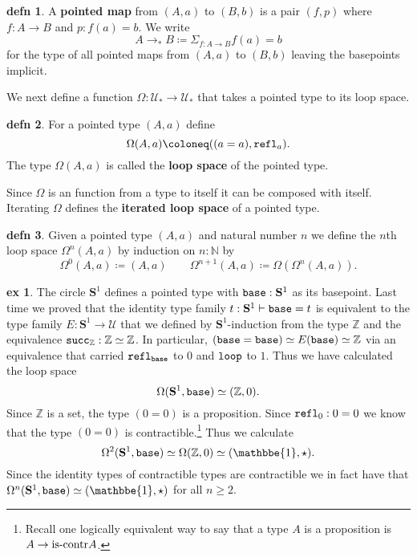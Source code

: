 \documentclass{amsart}
\theoremstyle{theorem}
\theoremstyle{definition}
\newtheorem*{defn}{defn}
\newtheorem*{ex}{ex}
\theoremstyle{remark}
\newcommand{\0}{\mathbbe{0}}
\newcommand{\1}{\mathbbe{1}}
\newcommand{\2}{\mathbbe{2}}
\newcommand{\3}{\mathbbe{3}}
\newcommand{\4}{\mathbbe{4}}
\newcommand{\NN}{\mathbb{N}}
\newcommand{\ZZ}{\mathbb{Z}}
\newcommand{\term}[1]{{\textup{\texttt{#1}}}}
\newcommand{\type}[1]{{\textup{#1}}}
\newcommand{\refl}{\term{refl}}
\newcommand{\UU}{{\mathcal{U}}}
\newcommand{\iscontr}{\type{is-contr}}
\newcommand{\Sone}{\mathbf{S}^1}
\newcommand{\base}{\term{base}}
\newcommand{\lloop}{\term{loop}}
\begin{document}
\begin{defn}
A \textbf{pointed map} from $(A,a)$ to $(B,b)$ is a pair $(f,p)$ where $f \colon A \to B$ and $p : f(a) = b$. We write
\[ A \to_* B \coloneq \Sigma_{f :A \to B} f(a)=b\]
for the type of all pointed maps from $(A,a)$ to $(B,b)$ leaving the basepoints implicit.
\end{defn}

We next define a function $\Omega \colon \UU_* \to \UU_*$ that takes a pointed type to its loop space.

\begin{defn} For a pointed type $(A,a)$ define
\[ \Omega(A,a) \coloneq ((a=a),\refl_a).\]
The type $\Omega(A,a)$ is called the \textbf{loop space} of the pointed type.
\end{defn}

Since $\Omega$ is an function from a type to itself it can be composed with itself. Iterating $\Omega$ defines the \textbf{iterated loop space} of a pointed type.

\begin{defn} Given a pointed type $(A,a)$ and natural number $n$ we define the $n$th loop space $\Omega^n(A,a)$ by induction on $n : \NN$ by
\[  \Omega^0(A,a) \coloneq (A,a) \qquad \Omega^{n+1}(A,a) \coloneq \Omega(\Omega^n(A,a)).\]
\end{defn}

\begin{ex} The circle $\Sone$ defines a pointed type with $\base : \Sone$ as its basepoint. Last time we proved that the identity type family $t : \Sone \vdash \base = t$ is equivalent to the type family $E : \Sone \to \UU$ that we defined by $\Sone$-induction from the type $\ZZ$ and the equivalence $\term{succ}_\ZZ : \ZZ \simeq \ZZ$. In particular, $(\base = \base) \simeq E(\base) \simeq \ZZ$ via an equivalence that carried $\refl_\base$ to $0$ and $\lloop$ to $1$. Thus we have calculated the loop space
\[ \Omega(\Sone,\base) \simeq (\ZZ,0).\]
Since $\ZZ$ is a set, the type $(0=0)$ is a proposition. Since $\refl_0 : 0=0$ we know that the type $(0=0)$ is contractible.\footnote{Recall one logically equivalent way to say that a type $A$ is a proposition is $A \to \iscontr{A}$.} Thus we calculate
\[ \Omega^2(\Sone,\base) \simeq \Omega(\ZZ,0) \simeq (\1, \star).\]
Since the identity types of contractible types are contractible we in fact have that $\Omega^n(\Sone,\base) \simeq (\1,\star)$ for all $n \geq 2$.
\end{ex}
\end{document}
